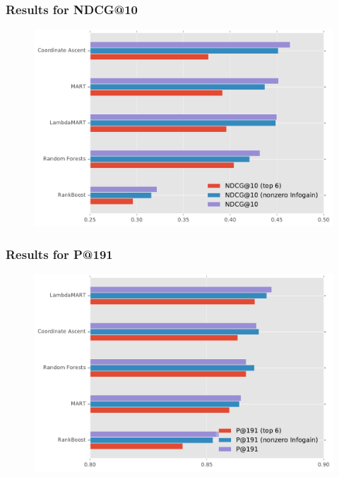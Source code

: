 
\begin{frame}
  \frametitle{Results for NDCG@10}
  \begin{figure}[tbph]
    \centering
    \includegraphics[width=\linewidth]{images/results_ndcg10}
  \end{figure}
\end{frame}

\begin{frame}
  \frametitle{Results for P@191}
  \begin{figure}[tbph]
    \centering
    \includegraphics[width=\linewidth]{images/results_p191}
  \end{figure}
\end{frame}

